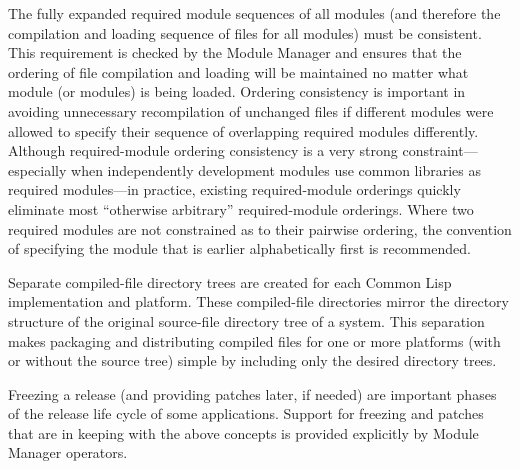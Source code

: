 \documentclass[10pt,twoside,english,pdftex]{article}
\begin{document}
\begin{tightitemize}
%
\item The fully expanded required module sequences of all modules (and
  therefore the compilation and loading sequence of files for all modules)
  must be consistent.  This requirement is checked by the Module Manager and
  ensures that the ordering of file compilation and loading will be maintained
  no matter what module (or modules) is being loaded.  Ordering consistency is
  important in avoiding unnecessary recompilation of unchanged files if
  different modules were allowed to specify their sequence of overlapping
  required modules differently.  Although required-module ordering consistency
  is a very strong constraint---especially when independently development
  modules use common libraries as required modules---in practice, existing
  required-module orderings quickly eliminate most ``otherwise arbitrary''
  required-module orderings.  Where two required modules are not constrained
  as to their pairwise ordering, the convention of specifying the module that
  is earlier alphabetically first is recommended.
%
\item Separate compiled-file directory trees are created for each Common Lisp
  implementation and platform.  These compiled-file directories mirror the
  directory structure of the original source-file directory tree of a system.
  This separation makes packaging and distributing compiled files for one or
  more platforms (with or without the source tree) simple by including only
  the desired directory trees.
%
\item Freezing a release (and providing patches later, if needed) are
  important phases of the release life cycle of some applications.  Support
  for freezing and patches that are in keeping with the above concepts is
  provided explicitly by Module Manager operators.
\end{tightitemize}

\end{document}
